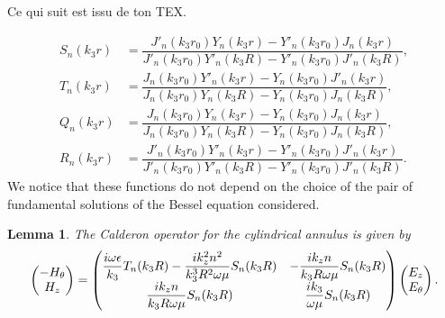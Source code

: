 \documentclass[12pt,%
    twoside,%
    a4paper,%
    openright, %
    ]{book}
\numberwithin{equation}{section} %
\newtheorem{lemma}[thm]{Lemma}
\renewcommand{\frac}[2]{\dfrac{#1}{#2}} %
\newcounter{REM}
\newenvironment{REM}[1][\theREM]
    {%
        \stepcounter{REM}
        \hypertarget{REM#1}{}%
        \pdfbookmark[0]{REM \theREM}{REM#1}
        \begin{tcolorbox}[%
                title={Remarque \theREM},%
                colback=red!30!white,%
                colframe=red!75!black,%
            ]
    }
    {
        \end{tcolorbox}%
    }%
\begin{document}
        \begin{REM}
          Ce qui suit est issu de ton TEX.
        \end{REM}
            \begin{align*}
                S_n(k_3r)&=\frac{J'_n(k_3r_0)Y_n(k_3r)-Y'_n(k_3r_0)J_n(k_3r)}{J'_n(k_3r_0)Y'_n(k_3R)-Y'_n(k_3r_0)J'_n(k_3R)},
                \\
                T_n(k_3r)&=\frac{J_n(k_3r_0)Y'_n(k_3r)-Y_n(k_3r_0)J'_n(k_3r)}{J_n(k_3r_0)Y_n(k_3R)-Y_n(k_3r_0)J_n(k_3R)},
                \\
                Q_n(k_3r)&=\frac{J_n(k_3r_0)Y_n(k_3r)-Y_n(k_3r_0)J_n(k_3r)}{J_n(k_3r_0)Y_n(k_3R)-Y_n(k_3r_0)J_n(k_3R)},
                \\
                R_n(k_3r)&=\frac{J'_n(k_3r_0)Y'_n(k_3r)-Y'_n(k_3r_0)J'_n(k_3r)}{J'_n(k_3r_0)Y'_n(k_3R)-Y'_n(k_3r_0)J'_n(k_3R)}.
            \end{align*}
            We notice that these functions do not depend on the choice of the pair of fundamental solutions of the Bessel equation considered. 

            \begin{lemma} The Calderon operator for the cylindrical annulus is given by
            $$
                \begin{pmatrix}
                    -H_{\theta}
                    \cr
                    H_z
                \end{pmatrix}
                =
                    \begin{pmatrix}
                        \frac{i\omega \epsilon}{k_3}T_n(k_3R)-\frac{ik_z^2n^2}{k_3^3R^2\omega \mu}S_n(k_3R) & -\frac{ik_zn}{k_3R\omega \mu}S_n(k_3R)
                        \cr
                        \frac{ik_zn}{k_3R\omega \mu}S_n(k_3R) & \frac{ik_3}{\omega \mu}S_n(k_3R)
                    \end{pmatrix}
                    \begin{pmatrix}
                        E_z
                        \cr
                        E_{\theta}
                    \end{pmatrix}.
            $$
            \end{lemma}
\end{document}
